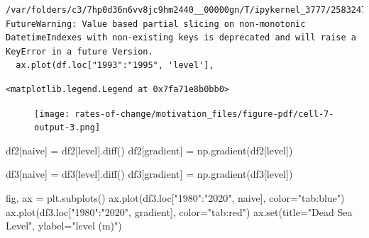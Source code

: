 \documentclass[
  letterpaper,
  DIV=11,
  numbers=noendperiod,
  oneside]{scrreprt}
\newenvironment{Shaded}{\begin{snugshade}}{\end{snugshade}}
\newcommand{\BuiltInTok}[1]{\textcolor[rgb]{0.00,0.23,0.31}{#1}}
\newcommand{\NormalTok}[1]{\textcolor[rgb]{0.00,0.23,0.31}{#1}}
\newcommand{\OperatorTok}[1]{\textcolor[rgb]{0.37,0.37,0.37}{#1}}
\newcommand{\StringTok}[1]{\textcolor[rgb]{0.13,0.47,0.30}{#1}}
\begin{document}
\begin{verbatim}
/var/folders/c3/7hp0d36n6vv8jc9hm2440__00000gn/T/ipykernel_3777/2583247388.py:11: FutureWarning: Value based partial slicing on non-monotonic DatetimeIndexes with non-existing keys is deprecated and will raise a KeyError in a future Version.
  ax.plot(df.loc["1993":"1995", 'level'],
\end{verbatim}

\begin{verbatim}
<matplotlib.legend.Legend at 0x7fa71e8b0bb0>
\end{verbatim}

\begin{figure}[H]

{\centering \texttt{[image: rates-of-change/motivation\_files/figure-pdf/cell-7-output-3.png]}

}

\end{figure}

\begin{Shaded}
\begin{Highlighting}[]
\NormalTok{df2[}\StringTok{\textquotesingle{}naive\textquotesingle{}}\NormalTok{] }\OperatorTok{=}\NormalTok{ df2[}\StringTok{\textquotesingle{}level\textquotesingle{}}\NormalTok{].diff()}
\NormalTok{df2[}\StringTok{\textquotesingle{}gradient\textquotesingle{}}\NormalTok{] }\OperatorTok{=}\NormalTok{ np.gradient(df2[}\StringTok{\textquotesingle{}level\textquotesingle{}}\NormalTok{])}

\NormalTok{df3[}\StringTok{\textquotesingle{}naive\textquotesingle{}}\NormalTok{] }\OperatorTok{=}\NormalTok{ df3[}\StringTok{\textquotesingle{}level\textquotesingle{}}\NormalTok{].diff()}
\NormalTok{df3[}\StringTok{\textquotesingle{}gradient\textquotesingle{}}\NormalTok{] }\OperatorTok{=}\NormalTok{ np.gradient(df3[}\StringTok{\textquotesingle{}level\textquotesingle{}}\NormalTok{])}
\end{Highlighting}
\end{Shaded}

\begin{Shaded}
\begin{Highlighting}[]
\NormalTok{fig, ax }\OperatorTok{=}\NormalTok{ plt.subplots()}
\NormalTok{ax.plot(df3.loc[}\StringTok{"1980"}\NormalTok{:}\StringTok{"2020"}\NormalTok{, }\StringTok{\textquotesingle{}naive\textquotesingle{}}\NormalTok{], color}\OperatorTok{=}\StringTok{"tab:blue"}\NormalTok{)}
\NormalTok{ax.plot(df3.loc[}\StringTok{"1980"}\NormalTok{:}\StringTok{"2020"}\NormalTok{, }\StringTok{\textquotesingle{}gradient\textquotesingle{}}\NormalTok{], color}\OperatorTok{=}\StringTok{"tab:red"}\NormalTok{)}
\NormalTok{ax.}\BuiltInTok{set}\NormalTok{(title}\OperatorTok{=}\StringTok{"Dead Sea Level"}\NormalTok{,}
\NormalTok{       ylabel}\OperatorTok{=}\StringTok{"level (m)"}\NormalTok{)}
\end{Highlighting}
\end{Shaded}
\end{document}
